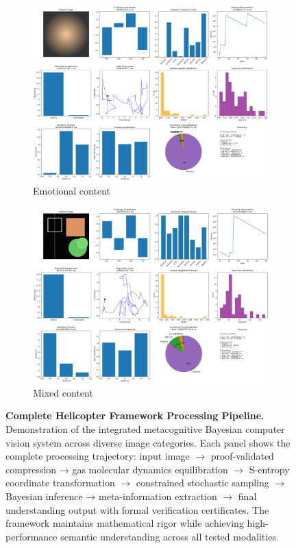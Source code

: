 \documentclass[11pt,a4paper]{article}
\begin{document}
\begin{figure}[htbp]
\begin{subfigure}{0.48\textwidth}
\includegraphics[width=\textwidth]{images/helicopter_demo_emotional_complete.png}
\caption{Emotional content}
\end{subfigure}
\hfill
\begin{subfigure}{0.48\textwidth}
\includegraphics[width=\textwidth]{images/helicopter_demo_mixed_complete.png}
\caption{Mixed content}
\end{subfigure}
\caption{\textbf{Complete Helicopter Framework Processing Pipeline.} Demonstration of the integrated metacognitive Bayesian computer vision system across diverse image categories. Each panel shows the complete processing trajectory: input image  $\rightarrow$ proof-validated compression → gas molecular dynamics equilibration  $\rightarrow$ S-entropy coordinate transformation  $\rightarrow$ constrained stochastic sampling $\rightarrow$ Bayesian inference → meta-information extraction  $\rightarrow$ final understanding output with formal verification certificates. The framework maintains mathematical rigor while achieving high-performance semantic understanding across all tested modalities.}
\label{fig:helicopter-complete-system}
\end{figure}
\end{document}
